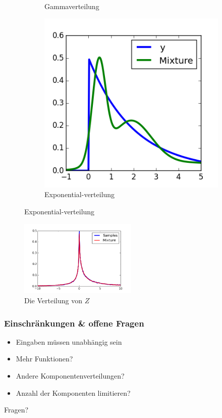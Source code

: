 \documentclass[11pt]{beamer}
\begin{document}
\begin{frame}
\begin{figure}
\begin{subfigure}[t]{0.3\textwidth}
      \caption{Gammaverteilung}
    \end{subfigure}
    \hfill
    \begin{subfigure}[t]{0.3\textwidth}
      \centering
      \includegraphics[width=\textwidth]{thesis/complex/introduction-var-y}
      \caption{Exponential-verteilung}
    \end{subfigure}
  \end{figure}
  \vspace{-1.5em}
  \begin{figure}
    \centering
    \includegraphics[width=0.5\textwidth]{thesis/complex/introduction-result}
    \caption{Die Verteilung von $Z$}
  \end{figure}
\end{frame}

\begin{frame}
  \frametitle{Einschränkungen \& offene Fragen}
  \begin{itemize}
  \item Eingaben müssen unabhängig sein
  \item Mehr Funktionen?
  \item Andere Komponentenverteilungen?
  \item Anzahl der Komponenten limitieren?
  \end{itemize}
\end{frame}

\begin{frame}
  \vfill
  \begin{center}
    \Huge{Fragen?}
  \end{center}
  \vfill
\end{frame}
\end{document}
